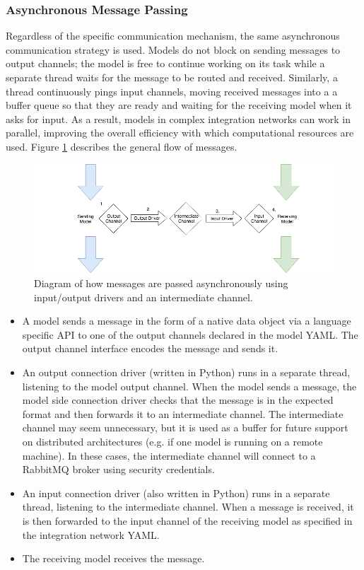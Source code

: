 \documentclass[journal]{IEEEtran}
\begin{document}
\subsubsection{Asynchronous Message Passing}\label{SSS:async}
%
Regardless of the specific communication mechanism, the same asynchronous
communication strategy is used. Models do not block on sending messages to 
output channels; the model is free to continue working on its task while 
a separate thread waits for the message to be routed and received. Similarly, 
a thread continuously pings input channels, moving received messages into a 
a buffer queue so that they are ready and waiting for the receiving model 
when it asks for input. As a result, models in complex integration networks 
can work in parallel, improving the overall efficiency with which computational 
resources are used. Figure \ref{fig:async} describes the general flow of messages.
%
\ifinclfig
 	\begin{figure}[htbp]
	\begin{center}
	\includegraphics[width=\columnwidth,keepaspectratio]{./images/io_drivers.png}
	\caption{Diagram of how messages are passed asynchronously using input/output drivers and an intermediate channel.}
	\label{fig:async}
	\end{center}
	\end{figure}
\fi
%
\begin{itemize}
	\item A model sends a message in the form of a native data object via a language 
specific API to one of the output channels declared in the model YAML. The output channel interface encodes the message and sends it.
	\item An output connection driver (written in Python) runs in a separate thread, listening to the model output channel. When the model sends a message, the model side connection driver checks that the message is in the expected format and then forwards it to an intermediate channel. The intermediate channel may seem unnecessary, but it is used as a buffer for future support on distributed architectures (e.g. if one model is running on a remote machine). In these cases, the intermediate channel will connect to a RabbitMQ broker using security credentials.
	\item An input connection driver (also written in Python) runs in a separate thread, listening to the intermediate channel. When a message is received, it is then forwarded to the input channel of the receiving model as specified in the integration network YAML.
	\item The receiving model receives the message.
\end{itemize}
\end{document}
